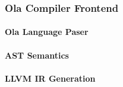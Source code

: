 \subsubsection{Ola Compiler Frontend}

\paragraph{Ola Language Paser}

\paragraph{AST Semantics}

\paragraph{LLVM IR Generation}
